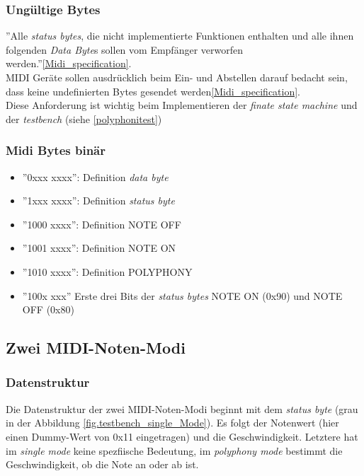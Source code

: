 \subsubsection*{Ungültige Bytes}
''Alle \textit{status bytes}, die nicht implementierte Funktionen enthalten und alle ihnen folgenden \textit{Data Byte}s sollen vom Empfänger verworfen werden.''\ref{Midi_specification}.\\ MIDI Geräte sollen ausdrücklich beim Ein- und Abstellen darauf bedacht sein, dass keine undefinierten Bytes gesendet werden\ref{Midi_specification}.\\
Diese Anforderung ist wichtig beim Implementieren der \textit{finate state machine} und der \textit{testbench} (siehe \ref{polyphonitest}) \\

\subsubsection*{Midi Bytes binär}\label{midi_binaer}
\begin{itemize}
	\item ''0xxx xxxx'': \hspace*{10mm}Definition \textit{data byte}
	\item ''1xxx xxxx'': \hspace*{10mm}Definition \textit{status byte}		
	\item ''1000 xxxx'': \hspace*{10mm}Definition NOTE OFF
	\item ''1001 xxxx'': \hspace*{10mm}Definition NOTE ON
	\item ''1010 xxxx'': \hspace*{10mm}Definition POLYPHONY
	\item ''100x xxx'' \hspace*{11mm}Erste drei Bits der \textit{status bytes} NOTE ON (0x90) und NOTE OFF (0x80)
\end{itemize}
\newpage
\subsection{Zwei MIDI-Noten-Modi}\label{note_modes}
\subsubsection{Datenstruktur}
Die Datenstruktur der zwei MIDI-Noten-Modi beginnt mit dem \textit{status byte} (grau in der Abbildung \ref{fig.testbench_single_Mode}). Es folgt der Notenwert (hier einen Dummy-Wert von 0x11 eingetragen) und die Geschwindigkeit. Letztere hat im \textit{single mode} keine spezfiische Bedeutung, im \textit{polyphony mode} bestimmt die Geschwindigkeit, ob die Note an oder ab ist.\\


